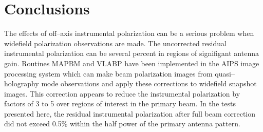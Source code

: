 \section {Conclusions}

   The effects of off--axis instrumental polarization can be a serious
problem when widefield polarization observations are made.
The uncorrected residual instrumental polarization can be several
percent in regions of signifigant antenna gain.
Routines MAPBM and VLABP have been implemented in the AIPS image
processing system which can make beam polarization images from
quasi--holography mode observations and apply these corrections to
widefield snapshot images.  This correction appears to reduce the
instrumental polarization by factors of 3 to 5 over regions of
interest in the primary beam.  In the tests presented here, the
residual instrumental polarization after full beam correction did not
exceed 0.5\% within the half power of the primary antenna pattern.


